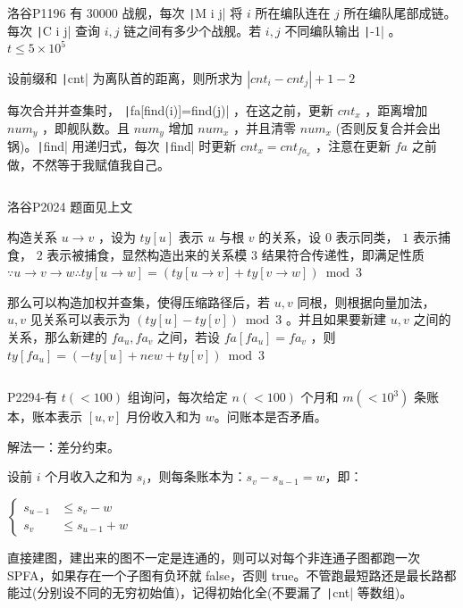 \documentclass[twocolumn,10pt]{ctexart}
\begin{document}
\begin{notebox}
洛谷P1196 有 $30000$ 战舰，每次 \texttt|M i j| 将 $i$ 所在编队连在 $j$ 所在编队尾部成链。每次 \texttt|C i j| 查询 $i,j$ 链之间有多少个战舰。若 $i,j$ 不同编队输出 \texttt|-1| 。 $t\le 5\times10^5$
\end{notebox}

设前缀和 \texttt|cnt| 为离队首的距离，则所求为 $|cnt_i-cnt_j|+1-2$

每次合并并查集时， \texttt|fa[find(i)]=find(j)| ，在这之前，更新 $cnt_x$ ，距离增加 $num_y$ ，即舰队数。且 $num_y$ 增加 $num_x$ ，并且清零 $num_x$ (否则反复合并会出锅)。\texttt|find| 用递归式，每次 \texttt|find| 时更新 $cnt_x=cnt_{fa_x}$ ，注意在更新 $fa$ 之前做，不然等于我赋值我自己。

\inputminted{cpp}{code/p1196_weighted_disjointset.cpp}

\begin{notebox}
洛谷P2024 题面见上文
\end{notebox}

构造关系 $u\to v$ ，设为 $ty[u]$ 表示 $u$ 与根 $v$ 的关系，设 $0$ 表示同类， $1$ 表示捕食， $2$ 表示被捕食，显然构造出来的关系模 $3$ 结果符合传递性，即满足性质 $\because u\to v\to w\therefore ty[u\to w]=(ty[u\to v]+ty[v\to w])\bmod 3$

那么可以构造加权并查集，使得压缩路径后，若 $u,v$ 同根，则根据向量加法， $u,v$ 见关系可以表示为 $(ty[u]-ty[v])\bmod 3$ 。并且如果要新建 $u,v$ 之间的关系，那么新建的 $fa_u,fa_v$ 之间，若设 $fa[fa_u]=fa_v$ ，则 $ty[fa_u]=(-ty[u]+new+ty[v])\bmod 3$

\inputminted{cpp}{code/p2024_weighted_disjointset.cpp}

\begin{notebox}
P2294-有 $t(< 100)$ 组询问，每次给定 $n(< 100)$ 个月和 $m(< 10^3)$ 条账本，账本表示 $[u,v]$ 月份收入和为 $w$。问账本是否矛盾。
\end{notebox}

解法一：差分约束。

设前 $i$ 个月收入之和为 $s_i$，则每条账本为：$s_v-s_{u-1}=w$，即：

\begin{adjustbox}{max width=\linewidth,center}
$\begin{cases}
s_{u-1}&\le s_v-w\\
s_v&\le s_{u-1}+w
\end{cases}$
\end{adjustbox}

直接建图，建出来的图不一定是连通的，则可以对每个非连通子图都跑一次 SPFA，如果存在一个子图有负环就 false，否则 true。不管跑最短路还是最长路都能过(分别设不同的无穷初始值)，记得初始化全(不要漏了 \texttt|cnt| 等数组)。
\end{document}
